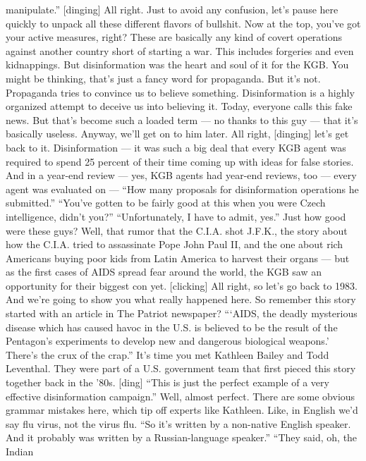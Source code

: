 \begin{itemize}
  manipulate.'' {[}dinging{]} All right. Just to avoid any confusion,
  let's pause here quickly to unpack all these different flavors of
  bullshit. Now at the top, you've got your active measures, right?
  These are basically any kind of covert operations against another
  country short of starting a war. This includes forgeries and even
  kidnappings. But disinformation was the heart and soul of it for the
  KGB. You might be thinking, that's just a fancy word for propaganda.
  But it's not. Propaganda tries to convince us to believe something.
  Disinformation is a highly organized attempt to deceive us into
  believing it. Today, everyone calls this fake news. But that's become
  such a loaded term --- no thanks to this guy --- that it's basically
  useless. Anyway, we'll get on to him later. All right, {[}dinging{]}
  let's get back to it. Disinformation --- it was such a big deal that
  every KGB agent was required to spend 25 percent of their time coming
  up with ideas for false stories. And in a year-end review --- yes, KGB
  agents had year-end reviews, too --- every agent was evaluated on ---
  ``How many proposals for disinformation operations he submitted.''
  ``You've gotten to be fairly good at this when you were Czech
  intelligence, didn't you?'' ``Unfortunately, I have to admit, yes.''
  Just how good were these guys? Well, that rumor that the C.I.A. shot
  J.F.K., the story about how the C.I.A. tried to assassinate Pope John
  Paul II, and the one about rich Americans buying poor kids from Latin
  America to harvest their organs --- but as the first cases of AIDS
  spread fear around the world, the KGB saw an opportunity for their
  biggest con yet. {[}clicking{]} All right, so let's go back to 1983.
  And we're going to show you what really happened here. So remember
  this story started with an article in The Patriot newspaper? ```AIDS,
  the deadly mysterious disease which has caused havoc in the U.S. is
  believed to be the result of the Pentagon's experiments to develop new
  and dangerous biological weapons.' There's the crux of the crap.''
  It's time you met Kathleen Bailey and Todd Leventhal. They were part
  of a U.S. government team that first pieced this story together back
  in the '80s. {[}ding{]} ``This is just the perfect example of a very
  effective disinformation campaign.'' Well, almost perfect. There are
  some obvious grammar mistakes here, which tip off experts like
  Kathleen. Like, in English we'd say flu virus, not the virus flu. ``So
  it's written by a non-native English speaker. And it probably was
  written by a Russian-language speaker.'' ``They said, oh, the Indian

\end{itemize}
